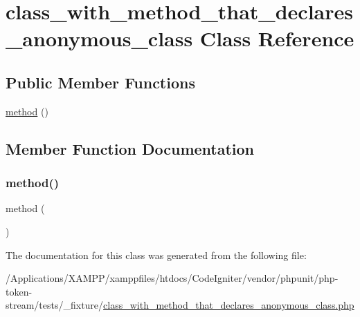 \hypertarget{classclass__with__method__that__declares__anonymous__class}{}\section{class\+\_\+with\+\_\+method\+\_\+that\+\_\+declares\+\_\+anonymous\+\_\+class Class Reference}
\label{classclass__with__method__that__declares__anonymous__class}
\subsection*{Public Member Functions}
\begin{DoxyCompactItemize}
\item 
\mbox{\hyperlink{classclass__with__method__that__declares__anonymous__class_a1496a05128f40913fc6e81af4414c461}{method}} ()
\end{DoxyCompactItemize}


\subsection{Member Function Documentation}
\mbox{\label{classclass__with__method__that__declares__anonymous__class_a1496a05128f40913fc6e81af4414c461}} 
\subsubsection{\texorpdfstring{method()}{method()}}
{\footnotesize\ttfamily method (\begin{DoxyParamCaption}{ }\end{DoxyParamCaption})}



The documentation for this class was generated from the following file\+:\begin{DoxyCompactItemize}
\item 
/\+Applications/\+X\+A\+M\+P\+P/xamppfiles/htdocs/\+Code\+Igniter/vendor/phpunit/php-\/token-\/stream/tests/\+\_\+fixture/\mbox{\hyperlink{class__with__method__that__declares__anonymous__class_8php}{class\+\_\+with\+\_\+method\+\_\+that\+\_\+declares\+\_\+anonymous\+\_\+class.\+php}}\end{DoxyCompactItemize}

